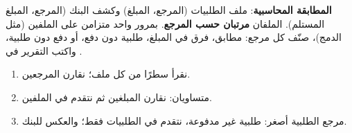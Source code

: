 \begin{statement}
\textbf{المطابقة المحاسبية}: ملف الطلبيات  (المرجع، المبلغ) وكشف البنك  (المرجع، المبلغ المستلم). الملفان \textbf{مرتبان حسب المرجع}. بمرور واحد متزامن على الملفين (مثل الدمج)، صنّف كل مرجع: مطابق، فرق في المبلغ، طلبية دون دفع، أو دفع دون طلبية، واكتب التقرير في .
\end{statement}
\begin{stepsbox}\begin{enumerate}
\item نقرأ سطرًا من كل ملف؛ نقارن المرجعين.
\item متساويان: نقارن المبلغين ثم نتقدم في الملفين.
\item مرجع الطلبية أصغر: طلبية غير مدفوعة، نتقدم في الطلبيات فقط؛ والعكس للبنك.
\end{enumerate}\end{stepsbox}
